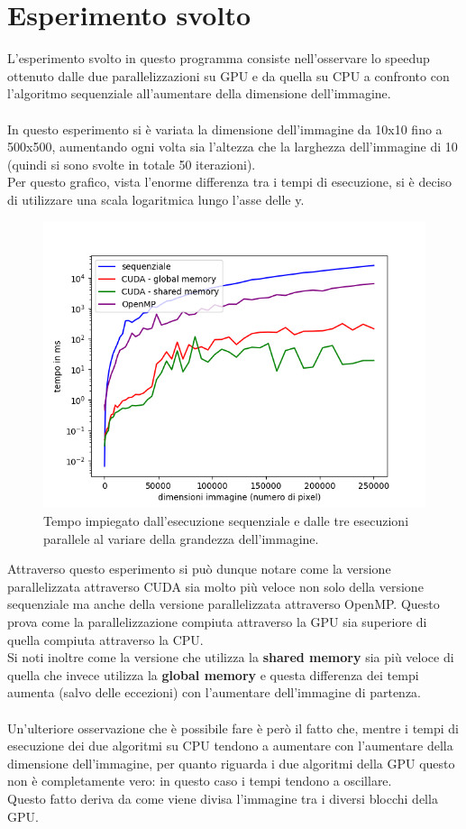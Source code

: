 \documentclass[10pt,twocolumn,letterpaper]{article}
\begin{document}
\section{Esperimento svolto}
L'esperimento svolto in questo programma consiste nell'osservare lo speedup ottenuto dalle due parallelizzazioni su GPU e da quella su CPU a confronto con l’algoritmo sequenziale all’aumentare della dimensione dell’immagine.\\
\\
In questo esperimento si è variata la dimensione dell'immagine da 10x10 fino a 500x500, aumentando ogni volta sia l'altezza che la larghezza dell'immagine di 10 (quindi si sono svolte in totale 50 iterazioni).\\
Per questo grafico, vista l'enorme differenza tra i tempi di esecuzione, si è deciso di utilizzare una scala logaritmica lungo l'asse delle y.
\begin{figure}[H]
\includegraphics[width=1.1\linewidth]{test/test1} 
\caption{\small Tempo impiegato dall'esecuzione sequenziale e dalle tre esecuzioni parallele al variare della grandezza dell'immagine.}
\label{t1}
\end{figure}
Attraverso questo esperimento si può dunque notare come la versione parallelizzata attraverso CUDA sia molto più veloce non solo della versione sequenziale ma anche della versione parallelizzata attraverso OpenMP. Questo prova come la parallelizzazione compiuta attraverso la GPU sia superiore di quella compiuta attraverso la CPU.\\
Si noti inoltre come la versione che utilizza la \textbf{shared memory} sia più veloce di quella che invece utilizza la \textbf{global memory} e questa differenza dei tempi aumenta (salvo delle eccezioni) con l'aumentare dell'immagine di partenza.\\
\\
Un'ulteriore osservazione che è possibile fare è però il fatto che, mentre i tempi di esecuzione dei due algoritmi su CPU tendono a aumentare con l'aumentare della dimensione dell'immagine, per quanto riguarda i due algoritmi della GPU questo non è completamente vero: in questo caso i tempi tendono a oscillare.\\
Questo fatto deriva da come viene divisa l'immagine tra i diversi blocchi della GPU.
\end{document}
